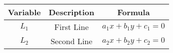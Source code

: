 \begin{center}
	\begin{tabular}{|c|c|c|} 
		\hline
		\textbf{Variable} & \textbf{Description} & \textbf{Formula} \\ 
		\hline
		$L_1$   &  First Line  &  $a_1 x+ b_1y + c_1 = 0$\\ 
		\hline
		$L_2$   &  Second Line &   $a_2 x+ b_2 y + c_2 = 0$\\ 
		\hline
	\end{tabular}
\end{center}  



